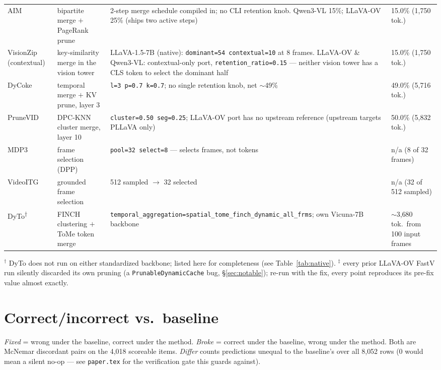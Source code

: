 \documentclass[11pt]{article}
\begin{document}
\begin{table}[H]
\begin{tabular}{p{2.1cm}p{3.9cm}p{4.8cm}p{2.7cm}}
    AIM & bipartite merge $+$ PageRank prune & 2-step merge schedule compiled in; no CLI retention knob. Qwen3-VL 15\%; LLaVA-OV 25\% (ships two active steps) & 15.0\% (1{,}750 tok.) \\
    VisionZip (contextual) & key-similarity merge in the vision tower & LLaVA-1.5-7B (native): \texttt{dominant=54 contextual=10} at 8 frames. LLaVA-OV \& Qwen3-VL: contextual-only port, \texttt{retention\_ratio=0.15} --- neither vision tower has a CLS token to select the dominant half & 15.0\% (1{,}750 tok.) \\
    DyCoke & temporal merge $+$ KV prune, layer 3 & \texttt{l=3 p=0.7 k=0.7}; no single retention knob, net $\sim$49\% & 49.0\% (5{,}716 tok.) \\
    PruneVID & DPC-KNN cluster merge, layer 10 & \texttt{cluster=0.50 seg=0.25}; LLaVA-OV port has no upstream reference (upstream targets PLLaVA only) & 50.0\% (5{,}832 tok.) \\
    \midrule
    MDP3 & frame selection (DPP) & \texttt{pool=32 select=8} --- selects frames, not tokens & n/a (8 of 32 frames) \\
    VideoITG & grounded frame selection & 512 sampled $\to$ 32 selected & n/a (32 of 512 sampled) \\
    DyTo\textsuperscript{$\dagger$} & FINCH clustering $+$ ToMe token merge & \texttt{temporal\_aggregation=}\allowbreak\texttt{spatial\_\allowbreak tome\_\allowbreak finch\_\allowbreak dynamic\_\allowbreak all\_frms}; own Vicuna-7B backbone & $\sim$3{,}680 tok.\ from 100 input frames \\
    \bottomrule
  \end{tabular}

  \bigskip
  \footnotesize $^{\dagger}$ DyTo does not run on either standardized backbone; listed here for completeness (see Table~\ref{tab:native}). $^{\ddagger}$ every prior LLaVA-OV FastV run silently discarded its own pruning (a \texttt{PrunableDynamicCache} bug, \S\ref{sec:notable}); re-run with the fix, every point reproduces its pre-fix value almost exactly.
\end{table}

\section{Correct/incorrect vs.\ baseline}
\label{sec:paired}

\emph{Fixed} = wrong under the baseline, correct under the method.
\emph{Broke} = correct under the baseline, wrong under the method. Both are
McNemar discordant pairs on the 4{,}018 scoreable items. \emph{Differ} counts
predictions unequal to the baseline's over all 8{,}052 rows (0 would mean a
silent no-op --- see \texttt{paper.tex} for the verification gate this
guards against).
\end{document}
